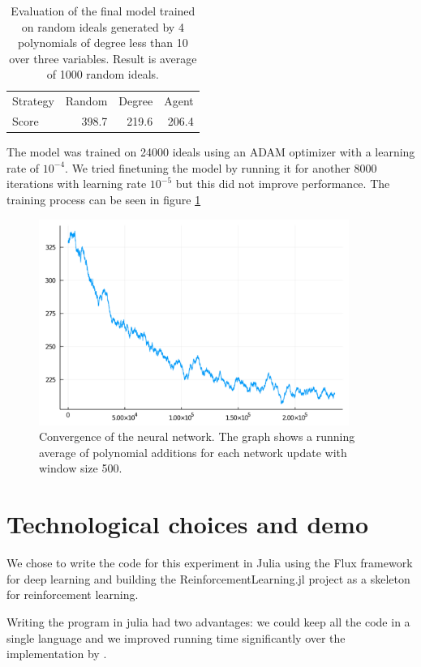\documentclass{article}
\theoremstyle{changedot}
\theoremstyle{changedotbreak}
\theoremstyle{nonumberplain}
\begin{document}
\begin{table}
  \centering
  \begin{tabular}{l|rrr}
    Strategy & Random & Degree & Agent \\
    Score    &  398.7 &  219.6 & 206.4
  \end{tabular}
  \caption{Evaluation of the final model trained on random ideals generated by 4 polynomials of degree less than 10 over three variables. Result is average of 1000 random ideals.}
  \label{tab:eval}
\end{table}

The model was trained on 24000 ideals using an ADAM optimizer with a learning rate of $10^{-4}$. We tried finetuning the model by running it for another 8000 iterations with learning rate $10^{-5}$ but this did not improve performance. The training process can be seen in figure \ref{fig:convergence}

\begin{figure}[h]
  \includegraphics[width=0.9\textwidth]{full_24k_En4_2layer.png}
  \caption{Convergence of the neural network. The graph shows a running average of polynomial additions for each network update with window size 500.}
  \label{fig:convergence}
\end{figure}


\section{Technological choices and demo}
We chose to write the code for this experiment in Julia using the Flux framework for deep learning and building the ReinforcementLearning.jl project as a skeleton for reinforcement learning.

Writing the program in julia had two advantages: we could keep all the code in a single language and we improved running time significantly over the implementation by \cite{peifer}.
\end{document}
